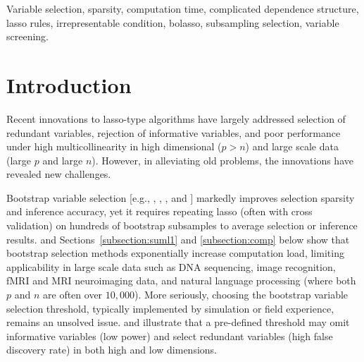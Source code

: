 \documentclass[11pt,review,authoryear]{elsarticle}
\begin{document}
\begin{keyword}
Variable selection, sparsity, computation time, complicated dependence structure, lasso rules, irrepresentable condition, bolasso, subsampling selection, variable screening.
\end{keyword}

\maketitle




\section{Introduction}

Recent innovations to lasso-type algorithms \citep{efronall04, friedman2007pathwise, friedman2010regularization} have largely addressed selection of redundant variables, rejection of informative variables, and poor performance under high multicollinearity in high dimensional ($p>n$) and large scale data (large $p$ and large $n$). However, in alleviating old problems, the innovations have revealed new challenges.

Bootstrap variable selection [e.g., \citet{bach2008bolasso}, \citet{meinshausen2010stability}, \citet{wang2011random}, and \citet{mameli2017estimating}] markedly improves selection sparsity and inference accuracy, yet it requires repeating lasso (often with cross validation) on hundreds of bootstrap subsamples to average selection or inference results. \citet{xu2012asymptotic} and Sections~\ref{subsection:suml1} and \ref{subsection:comp} below show that bootstrap selection methods exponentially increase computation load, limiting applicability in large scale data such as DNA sequencing, image recognition, fMRI and MRI neuroimaging data, and natural language processing (where both $p$ and $n$ are often over $10,000$). More seriously, choosing the bootstrap variable selection threshold, typically implemented by simulation or field experience, remains an unsolved issue. \citet{bach2008bolasso} and \citet[Figure~2]{huang2014stat} illustrate that a pre-defined threshold may omit informative variables (low power) and select redundant variables (high false discovery rate) in both high and low dimensions.
\end{document}
